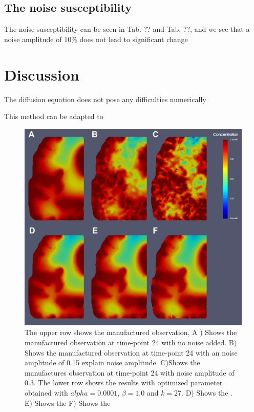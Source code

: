 \documentclass[11pt,a4paper]{article}
\begin{document}
\subsection{The noise susceptibility}

The noise susceptibility can be seen in Tab. ?? and Tab. ??, and we see that a noise amplitude of $10 \%$ does not lead to significant change 




\section{Discussion}



The diffusion equation does not pose any difficulties numerically 


This method can be adapted to 



\begin{figure}
\centering
\includegraphics[scale=0.2]{27-12-hours-scale-0-1-3.png}  
\caption{The upper row shows the manufactured observation, A ) Shows the manufactured observation at time-point 24 with no noise added. B) Shows the manufactured observation at time-point 24 with an noise amplitude of 0.15 {\color{red} explain noise amplitude}. C)Shows the manufactures observation at time-point 24 with noise amplitude of 0.3. The lower row shows the results with optimized parameter obtained with $alpha=0.0001$, $\beta=1.0$ and $k=27$. D) Shows the  . E)  Shows the  F)  Shows the  }
\end{figure}
\end{document}
